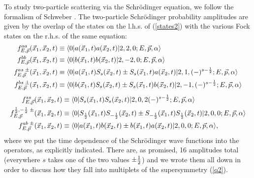 \documentclass[11pt]{article}
\begin{document}
To study two-particle scattering via the Schr\" odinger equation, we follow the formalism of  Schweber
  \cite{Schweber}. The two-particle Schr\" odinger probability amplitudes are given by the overlap of the states on the l.h.s. of (\ref{states2}) with the various Fock states on the r.h.s. of the same equation: 
 \begin{align}
 f^{aa}_{E,\vec{p}}(\vec{x}_1,\vec{x}_2,t) &\equiv \langle 0| a(\vec{x}_1,t) a(\vec{x}_2,t) |2,2,0; E, \vec{p},\alpha\rangle  \label{aa} 
\\
 f^{bb}_{E,\vec{p}}(\vec{x}_1,\vec{x}_2,t) &\equiv \langle 0| b(\vec{x}_1,t) b(\vec{x}_2,t) |2,-2,0; E, \vec{p}, 
 \alpha\rangle\label{bb} 
\\
  f^{as \; \pm}_{E,\vec{p}}(\vec{x}_1,\vec{x}_2,t) &\equiv \langle 0| a(\vec{x}_1,t) S_s(\vec{x}_2,t) \pm  S_s(\vec{x}_1,t) a(\vec{x}_2,t)|2, 1, (-)^{s-{1\over 2}}; E, \vec{p},\alpha \rangle \label{as}\\    f^{bs \; \pm}_{E,\vec{p}}(\vec{x}_1,\vec{x}_2,t) &\equiv \langle 0| b(\vec{x}_1,t) S_s(\vec{x}_2,t) \pm  S_s(\vec{x}_1,t) b(\vec{x}_2,t)|2, -1, (-)^{s-{1\over 2}}; E, \vec{p},\alpha \rangle \label{bs} \end{align}
    \begin{align}    f^{ss}_{E,\vec{p}}(\vec{x}_1,\vec{x}_2,t) &\equiv \langle 0| S_s(\vec{x}_1,t) S_s(\vec{x}_2,t)  |2, 0, 2(-)^{s-{1\over 2}}; E, \vec{p},\alpha \rangle \label{ss}\\    f^{{1\over 2},-{1\over 2} \; \pm}_{E,\vec{p}}(\vec{x}_1,\vec{x}_2,t) &\equiv \langle 0| S_{1\over 2}(\vec{x}_1,t) S_{-{1\over 2}}(\vec{x}_2,t) \pm S_{-{1\over 2}}(\vec{x}_1,t) S_{ {1\over 2}}(\vec{x}_2,t) |2, 0, 0; E, \vec{p},\alpha \rangle \label{ss2} \\  f^{ab \; \pm}_{E,\vec{p}}(\vec{x}_1,\vec{x}_2,t) & \equiv \langle 0| a(\vec{x}_1,t) b(\vec{x}_2,t) \pm b(\vec{x}_1,t) a(\vec{x}_2, t) |2,0,0; E, \vec{p},\alpha\rangle  \label{ab} ,
  \end{align}
where  we put the time dependence of the Schr\" odinger wave functions into the operators, as explicitly indicated.
There are, as promised, 16 amplitudes total (everywhere $s$ takes one of the two values $\pm {1 \over 2}$) and we wrote them all down in order to discuss how they fall  into multiplets of the supersymmetry (\ref{q2}).
\end{document}
